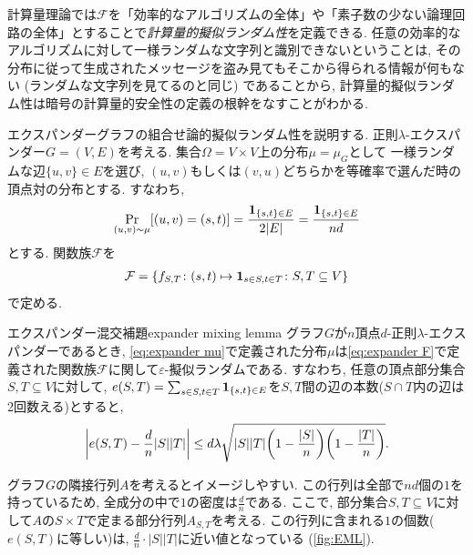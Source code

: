 計算量理論では$\mathcal{F}$を「効率的なアルゴリズムの全体」や「素子数の少ない論理回路の全体」とすることで\emph{計算量的擬似ランダム性}を定義できる.
任意の効率的なアルゴリズムに対して一様ランダムな文字列と識別できないということは, その分布に従って生成されたメッセージを盗み見てもそこから得られる情報が何もない (ランダムな文字列を見てるのと同じ) であることから, 計算量的擬似ランダム性は暗号の計算量的安全性の定義の根幹をなすことがわかる.

エクスパンダーグラフの組合せ論的擬似ランダム性を説明する.
正則$\lambda$-エクスパンダー$G=(V,E)$を考える.
集合$\Omega=V\times V$上の分布$\mu = \mu_G$として
一様ランダムな辺$\{u,v\}\in E$を選び, $(u,v)$もしくは$(v,u)$どちらかを等確率で選んだ時の頂点対の分布とする.
すなわち,
\begin{align}
    \Pr_{(u,v)\sim \mu}\sbra*{ (u,v) = (s,t)} = \frac{\indicator{\{s,t\}\in E}}{2\abs{E}} = \frac{\indicator{\{s,t\}\in E}}{nd} \label{eq:expander mu}
\end{align}
とする.
関数族$\mathcal{F}$を
\begin{align}
    \mathcal{F} = \cbra*{ f_{S,T} \colon (s,t) \mapsto \indicator{s\in S,t\in T} \colon S,T\subseteq V}  \label{eq:expander F}
\end{align}
で定める.
%
\begin{lemma}{エクスパンダー混交補題}{expander mixing lemma}
    グラフ$G$が$n$頂点$d$-正則$\lambda$-エクスパンダーであるとき, \cref{eq:expander mu}で定義された分布$\mu$は\cref{eq:expander F}で定義された関数族$\mathcal{F}$に関して$\varepsilon$-擬似ランダムである.
    すなわち, 任意の頂点部分集合$S,T\subseteq V$に対して,
    $e(S,T) = \sum_{s\in S,t\in T} \indicator{\{s,t\} \in E}$を$S,T$間の辺の本数($S\cap T$内の辺は2回数える)とすると,
    \[
        \abs*{e(S,T) - \frac{d}{n}|S||T|} \le d\lambda\sqrt{|S||T|\rbra*{1-\frac{|S|}{n}}\rbra*{1-\frac{|T|}{n}}}.
    \]
\end{lemma}
%
グラフ$G$の隣接行列$A$を考えるとイメージしやすい.
この行列は全部で$nd$個の$1$を持っているため, 全成分の中で$1$の密度は$\frac{d}{n}$である.
ここで, 部分集合$S,T\subseteq V$に対して$A$の$S\times T$で定まる部分行列$A_{S,T}$を考える.
この行列に含まれる$1$の個数($e(S,T)$に等しい)は, $\frac{d}{n}\cdot |S||T|$に近い値となっている (\cref{fig:EML}).
